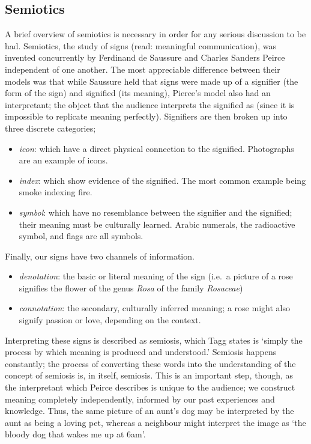 \subsection{Semiotics}
A brief overview of semiotics is necessary in order for any serious discussion to be had.
Semiotics, the study of signs (read: meaningful communication), was invented concurrently by Ferdinand de Saussure and Charles Sanders Peirce independent of one another.
The most appreciable difference between their models was that while Saussure held that signs were made up of a signifier (the form of the sign) and signified (its meaning), Pierce's model also had an interpretant; the object that the audience interprets the signified as (since it is impossible to replicate meaning perfectly).
Signifiers are then broken up into three discrete categories; 
\begin{itemize}
\item \emph{\gls{icon}}: which have a direct physical connection to the signified. Photographs are an example of icons.
\item \emph{\gls{index}}: which show evidence of the signified. The most common example being smoke indexing fire.
\item \emph{\gls{symbol}}: which have no resemblance between the signifier and the signified; their meaning must be culturally learned. Arabic numerals, the radioactive symbol, and flags are all symbols.
\end{itemize}

Finally, our signs have two channels of information.
\begin{itemize}
\item \emph{\gls{denotation}}: the basic or literal meaning of the sign (i.e.\ a picture of a rose signifies the flower of the genus \emph{Rosa} of the family \emph{Rosaceae})
\item \emph{\gls{connotation}}: the secondary, culturally inferred meaning; a rose might also signify passion or love, depending on the context.
\end{itemize}

Interpreting these signs is described as semiosis, which Tagg states is `simply the process by which meaning is produced and understood.'\autocite[156]{taggMusicMeaningsModern2013}
Semiosis happens constantly; the process of converting these words into the understanding of the concept of semiosis is, in itself, semiosis. 
This is an important step, though, as the interpretant which Peirce describes is unique to the audience; we construct meaning completely independently, informed by our past experiences and knowledge.
Thus, the same picture of an aunt's dog may be interpreted by the aunt as being a loving pet, whereas a neighbour might interpret the image as `the bloody dog that wakes me up at 6am'.

